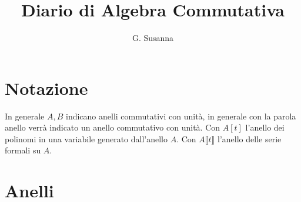 \documentclass[italian]{article}
\title{Diario di Algebra Commutativa}
\author{G. Susanna}
\date{}
\begin{document}
    \maketitle
    \tableofcontents
    
    \section{Notazione}
    
    In generale $A,B$ indicano anelli commutativi con unità, in generale 
    con la parola anello verrà indicato un anello commutativo con unità.
    Con $A\left[t\right]$ l'anello dei polinomi in una variabile generato 
    dall'anello $A$. Con $A\llbracket t \rrbracket$ l'anello delle serie formali su $A$.
    
    \section{Anelli}
\end{document}
